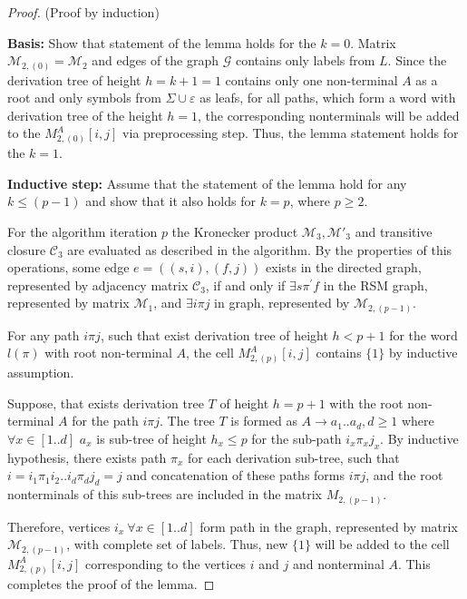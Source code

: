 \begin{proof}{(Proof by induction)}

    \textbf{Basis:} Show that statement of the lemma holds for the $k = 0$. Matrix
    $\mathcal{M}_{2,(0)} = \mathcal{M}_2$ and edges of the graph $\mathcal{G}$ contains only labels from $L$. 
    Since the derivation tree of height $h = k + 1 = 1$ contains only one non-terminal 
    $A$ as a root and only symbols from $\Sigma \cup {\varepsilon}$ as leafs, 
    for all paths, which form a word with derivation tree of the height $h = 1$, 
    the corresponding nonterminals will be added to the $M_{2,(0)}^A[i,j]$ via preprocessing step. Thus, the lemma statement holds for the $k = 1$.

    \textbf{Inductive step:} Assume that the statement of the lemma hold for any
    $k \leq (p - 1)$ and show that it also holds for $k = p$, where $p \geq 2$.
    
    For the algorithm iteration $p$ the Kronecker product $\mathcal{M}_3, \mathcal{M}'_3$ and transitive
    closure $\mathcal{C}_3$ are evaluated as described in the algorithm. By the properties
    of this operations, some edge $e = ((s,i),(f,j))$ exists in the directed
    graph, represented by adjacency matrix $\mathcal{C}_3$, if and only if $\exists s
    \pi^{'} f$ in the RSM graph, represented by matrix $\mathcal{M}_1$, and 
    $\exists i \pi j$ in graph, represented by $\mathcal{M}_{2,(p-1)}$. 
    
    For any path $i \pi j$, such that exist derivation tree of height $h < p + 1$ 
    for the word $l(\pi)$ with root non-terminal $A$, the cell $M_{2,(p)}^A[i,j]$ contains $\{1\}$ by inductive assumption.
    
    Suppose, that exists derivation tree $T$ of height $h = p + 1$ with the root 
    non-terminal $A$ for the path $i \pi j$. The tree $T$ is formed as
    $A \to a_1 .. a_d, d \geq 1$ where $\forall x \in [1..d]$ $a_x$ is sub-tree of
    height $h_x \leq p$ for the sub-path $i_x \pi_x j_x$. 
    By inductive hypothesis, there exists path $\pi_x$ for each derivation sub-tree, 
    such that $i = i_1 \pi_1 i_2 .. i_{d} \pi_{d} j_{d} = j$ and concatenation 
    of these paths forms $i \pi j$, and the root nonterminals of 
    this sub-trees are included in the matrix $M_{2, (p - 1)}$. 
    
    Therefore, vertices $i_x ~\forall x \in [1..d]$ form path in the graph, 
    represented by matrix $\mathcal{M}_{2, (p-1)}$, with complete set of labels.
    Thus, new $\{1\}$ will be added to the cell $M_{2,(p)}^A[i,j]$ corresponding to the vertices $i$ and $j$ and nonterminal $A$. This completes the proof of the lemma.

\end{proof}


